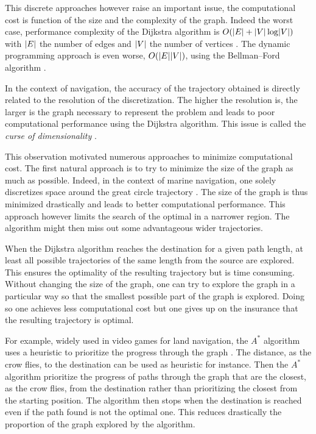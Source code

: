 This discrete approaches however raise an important issue, the computational cost is function of the size and the complexity of the graph.
Indeed the worst case, performance complexity of the Dijkstra algorithm is $O(\lvert E\rvert + \lvert V\rvert \log \lvert V\rvert)$ with $\lvert E\rvert$ the number of edges and $\lvert V\rvert$ the number of vertices \citep{fredman1987fibonacci}.
The dynamic programming approach is even worse, $O(\lvert E\rvert \lvert V\rvert)$, using the Bellman–Ford algorithm \citep{ford1956network, bellman1958routing}.

In the context of navigation, the accuracy of the trajectory obtained is directly related to the resolution of the discretization.
The higher the resolution is, the larger is the graph necessary to represent the problem and leads to poor computational performance using the Dijkstra algorithm. 
This issue is called the \textit{curse of dimensionality} \citep{bellman1957dynamic}.

This observation motivated numerous approaches to minimize computational cost.
The first natural approach is to try to minimize the size of the graph as much as possible.
Indeed, in the context of marine navigation, one solely discretizes space around the great circle trajectory \citep{kobayashi2017advanced}.
The size of the graph is thus minimized drastically and leads to better computational performance.
This approach however limits the search of the optimal in a narrower region.
The algorithm might then miss out some advantageous wider trajectories.

When the Dijkstra algorithm reaches the destination for a given path length, at least all possible trajectories of the same length from the source are explored.
This ensures the optimality of the resulting trajectory but is time consuming.
Without changing the size of the graph, one can try to explore the graph in a particular way so that the smallest possible part of the graph is explored.
Doing so one achieves less computational cost but one gives up on the insurance that the resulting trajectory is optimal.

For example, widely used in video games for land navigation, the $A^*$ algorithm uses a heuristic to prioritize the progress through the graph \citep{hart1968formal}.
The distance, as the crow flies, to the destination can be used as heuristic for instance.
Then the $A^*$ algorithm prioritize the progress of paths through the graph that are the closest, as the crow flies, from the destination rather than prioritizing the closest from the starting position.
The algorithm then stops when the destination is reached even if the path found is not the optimal one.
This reduces drastically the proportion of the graph explored by the algorithm.

